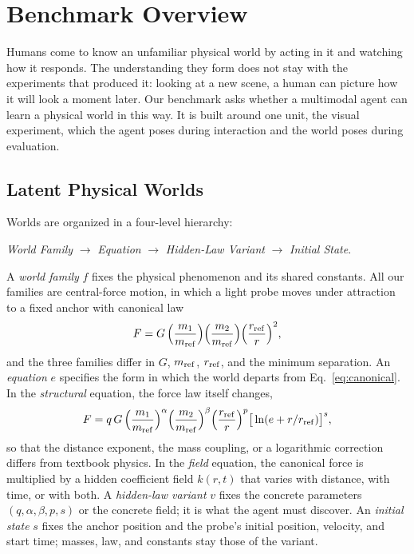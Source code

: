\section{Benchmark Overview}
\label{sec:benchmark}

Humans come to know an unfamiliar physical world by acting in it and watching how it responds. The understanding they form does not stay with the experiments that produced it: looking at a new scene, a human can picture how it will look a moment later. Our benchmark asks whether a multimodal agent can learn a physical world in this way. It is built around one unit, the visual experiment, which the agent poses during interaction and the world poses during evaluation.

\subsection{Latent Physical Worlds}

Worlds are organized in a four-level hierarchy:
\begin{center}
\textit{World Family}
$\rightarrow$ \textit{Equation}
$\rightarrow$ \textit{Hidden-Law Variant}
$\rightarrow$ \textit{Initial State}.
\end{center}
A \emph{world family} $f$ fixes the physical phenomenon and its shared constants. All our families are central-force motion, in which a light probe moves under attraction to a fixed anchor with canonical law
\begin{equation}
  F = G\,\Big(\frac{m_1}{m_{\rm ref}}\Big)\Big(\frac{m_2}{m_{\rm ref}}\Big)\Big(\frac{r_{\rm ref}}{r}\Big)^{2},
  \label{eq:canonical}
\end{equation}
and the three families differ in $G$, $m_{\rm ref}$, $r_{\rm ref}$, and the minimum separation. An \emph{equation} $e$ specifies the form in which the world departs from Eq.~\eqref{eq:canonical}. In the \emph{structural} equation, the force law itself changes,
\begin{equation}
  F = q\,G\,\Big(\frac{m_1}{m_{\rm ref}}\Big)^{\alpha}\Big(\frac{m_2}{m_{\rm ref}}\Big)^{\beta}\Big(\frac{r_{\rm ref}}{r}\Big)^{p}\big[\ln(e + r/r_{\rm ref})\big]^{s},
  \label{eq:structural}
\end{equation}
so that the distance exponent, the mass coupling, or a logarithmic correction differs from textbook physics. In the \emph{field} equation, the canonical force is multiplied by a hidden coefficient field $k(r,t)$ that varies with distance, with time, or with both. A \emph{hidden-law variant} $v$ fixes the concrete parameters $(q,\alpha,\beta,p,s)$ or the concrete field; it is what the agent must discover. An \emph{initial state} $s$ fixes the anchor position and the probe's initial position, velocity, and start time; masses, law, and constants stay those of the variant.

